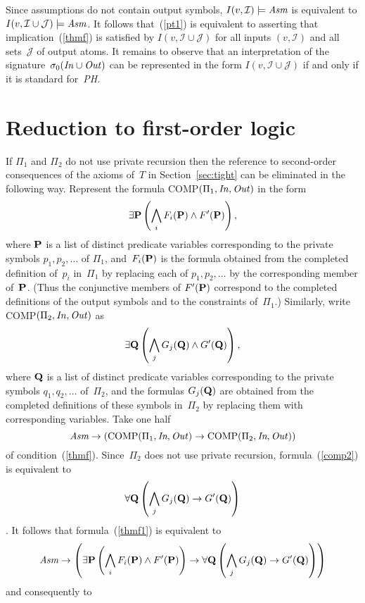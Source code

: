 \documentclass{tlp}
\def\beq{\begin{equation}}
\def\eeq#1{\label{#1}\end{equation}}
\newcommand{\I}{\mathcal{I}}
\newcommand{\J}{\mathcal{J}}
\begin{document}
Since assumptions do not contain output symbols,
$I(v,\I)\models\emph{Asm}$ is equivalent to $I(v,\I\cup\J)\models\emph{Asm}$.
It follows that~(\ref{pt1}) is equivalent to asserting that
implication~(\ref{thmf}) is satisfied by $I(v,\I\cup\J)$ for all
inputs $(v,\I)$ and all sets~$\J$ of output atoms.  It remains to observe
that an interpretation of the
signature~$\sigma_0(\emph{In\/}\cup\emph{Out\/})$ can be represented in
the form $I(v,\I\cup\J)$ if and only if it is
standard for~\emph{PH}.

\section{Reduction to first-order logic} \label{sec:elim}

If $\Pi_1$ and $\Pi_2$ do not use private recursion then
the reference to second-order consequences of the
axioms of~$T$ in Section~\ref{sec:tight} can be eliminated in the
following way.  Represent the formula
COMP$(\Pi_1,\emph{In\/},\emph{Out\/})$ in the form
$$
\exists {\bf P}\left(\bigwedge_i F_i({\bf P}) \land F'({\bf P})\right),
$$
where $\bf P$ is a list
of distinct predicate variables
corresponding to the
private symbols $p_1,p_2,\dots$
of $\Pi_1$, and~$F_i({\bf P})$ is
the formula obtained from the completed definition
of~$p_i$ in~$\Pi_1$ by replacing each of $p_1,p_2,\dots$ by the
corresponding member of~$\bf P$. (Thus the conjunctive members
of $F'({\bf P})$ correspond to the completed definitions of the output
symbols and to the constraints of~$\Pi_1$.)  Similarly, write
COMP$(\Pi_2,\emph{In\/},\emph{Out\/})$ as
\beq
\exists {\bf Q}\left(\bigwedge_j G_j({\bf Q}) \land G'({\bf Q})\right),
\eeq{comp2}
where $\bf Q$ is a list of distinct predicate variables corresponding to the
private symbols $q_1,q_2,\dots$ of~$\Pi_2$,
and the formulas $G_j({\bf Q})$ are obtained from the completed
definitions of these symbols in~$\Pi_2$ by replacing them with
corresponding variables.  Take one half
\beq
\emph{Asm}\to(\hbox{COMP}(\Pi_1,\emph{In},\emph{Out\/}) \to
\hbox{COMP}(\Pi_2,\emph{In},\emph{Out\/}))
\eeq{thmf1}
of condition~(\ref{thmf}).
Since~$\Pi_2$ does not use private
recursion, formula~(\ref{comp2}) is equivalent to
$$\forall {\bf Q}\left(\bigwedge_j G_j({\bf Q}) \to G'({\bf Q})\right)$$
\cite[Theorem~3]{fan20}.  It follows that formula~(\ref{thmf1}) is
equivalent to
$$
\emph{Asm}\to
 \left(\exists {\bf P}\left(\bigwedge_i F_i({\bf P}) \land F'({\bf P})\right)
 \to\forall {\bf Q}\left(\bigwedge_j G_j({\bf Q}) \to G'({\bf Q})\right)\right)
$$
and consequently to
\end{document}

